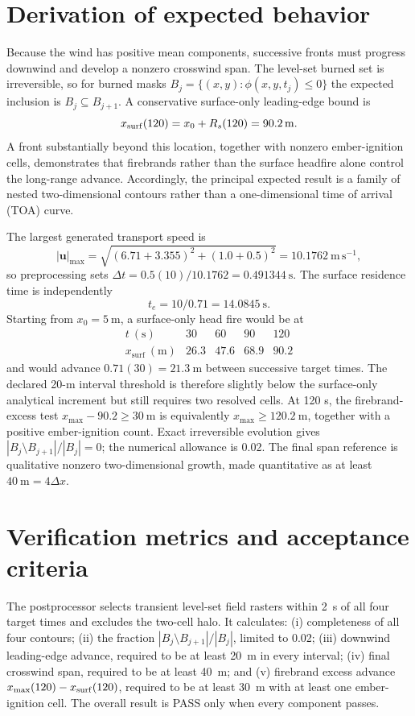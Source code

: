 \section{Derivation of expected behavior}
Because the wind has positive mean components, successive fronts must progress downwind and develop a nonzero crosswind span. The level-set burned set is irreversible, so for burned masks $B_j=\{(x,y):\phi(x,y,t_j)\le0\}$ the expected inclusion is $B_j\subseteq B_{j+1}$. A conservative surface-only leading-edge bound is
\[
x_{\rm surf}(120)=x_0+R_s(120)=\SI{90.2}{m}.
\]
A front substantially beyond this location, together with nonzero ember-ignition cells, demonstrates that firebrands rather than the surface headfire alone control the long-range advance. Accordingly, the principal expected result is a family of nested two-dimensional contours rather than a one-dimensional time of arrival (TOA) curve.

The largest generated transport speed is
\[
 |\mathbf u|_{\max}=\sqrt{(6.71+3.355)^2+(1.0+0.5)^2}
 =10.1762~\mathrm{m\,s^{-1}},
\]
so preprocessing sets
\(\Delta t=0.5(10)/10.1762=0.491344~\mathrm{s}\).  The surface residence
time is independently
\[
 t_e=10/0.71=14.0845~\mathrm{s}.
\]
Starting from \(x_0=5~\mathrm{m}\), a surface-only head fire would be at
\[
\begin{array}{c|rrrr}
t~(\mathrm{s})&30&60&90&120\\\hline
x_{\mathrm{surf}}~(\mathrm{m})&26.3&47.6&68.9&90.2
\end{array}
\]
and would advance \(0.71(30)=21.3~\mathrm{m}\) between successive target
times.  The declared 20-m interval threshold is therefore slightly below the
surface-only analytical increment but still requires two resolved cells.
At 120 s, the firebrand-excess test
\(x_{\max}-90.2\geq30~\mathrm{m}\) is equivalently
\(x_{\max}\geq120.2~\mathrm{m}\), together with a positive ember-ignition
count.  Exact irreversible evolution gives
\(|B_j\setminus B_{j+1}|/|B_j|=0\); the numerical allowance is 0.02.
The final span reference is qualitative nonzero two-dimensional growth, made
quantitative as at least \(40~\mathrm{m}=4\Delta x\).

\section{Verification metrics and acceptance criteria}
The postprocessor selects transient level-set field rasters within \SI{2}{s} of all four target times and excludes the two-cell halo. It calculates: (i) completeness of all four contours; (ii) the fraction $|B_j\setminus B_{j+1}|/|B_j|$, limited to 0.02; (iii) downwind leading-edge advance, required to be at least \SI{20}{m} in every interval; (iv) final crosswind span, required to be at least \SI{40}{m}; and (v) firebrand excess advance $x_{\max}(120)-x_{\rm surf}(120)$, required to be at least \SI{30}{m} with at least one ember-ignition cell. The overall result is PASS only when every component passes.

